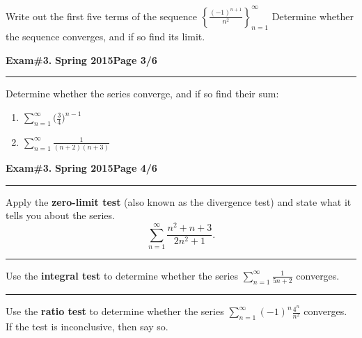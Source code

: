 \documentclass[12pt]{article}
\theoremstyle{definition}
\begin{document}
{\problem[10pts] Write out the first five terms of the sequence $\left\{ \displaystyle{\frac{(-1)^{n+1}}{n^2}} \right\}_{n=1}^\infty$ \newline Determine whether the sequence converges, and if so find its limit.
\vspace{7cm}
\begin{flushright}
\end{flushright}
\newpage


\hfill{\large\bf Exam\#3.}\hfill{\large\bf
  Spring 2015}\hfill{\large\bf Page 3/6}\hrule

\bigskip
{\problem[20 pts]  Determine whether the series converge, and if so find their sum:}
\begin{enumerate}
\item $\displaystyle{\sum_{n=1}^\infty \Big( \frac{3}{4} \Big)^{n-1}}$
\vspace{7cm}
\begin{flushright}
\end{flushright}
\item $\displaystyle{\sum_{n=1}^\infty \frac{1}{(n+2)(n+3)}}$
\vspace{7cm}
\begin{flushright}
\end{flushright}
\end{enumerate}
\newpage

\hfill{\large\bf Exam\#3.}\hfill{\large\bf
  Spring 2015}\hfill{\large\bf Page 4/6}\hrule

\bigskip
{\problem[10 pts]  Apply the \textbf{zero-limit test} (also known as
  the divergence test) and state what it tells you about the series.}
\begin{equation*}
\sum_{n=1}^\infty \frac{n^2+n+3}{2n^2+1}.
\end{equation*}
\vspace{2cm}
\hrule
{\problem[10 pts]  Use the \textbf{integral test} to determine
  whether the series $\displaystyle{\sum_{n=1}^\infty \frac{1}{5n+2}}$
  converges.} 
\vspace{6.5cm}
\hrule
{\problem[10 pts]  Use the \textbf{ratio test} to determine whether
  the series $\displaystyle{\sum_{n=1}^\infty (-1)^n \frac{4^n}{n^2}}$  
  converges.  If the test is inconclusive, then say so.} 
\newpage

}
\end{document}
